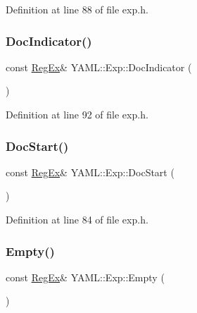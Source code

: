 Definition at line 88 of file exp.\+h.

\mbox{\label{namespace_y_a_m_l_1_1_exp_a1e28f9da39a4eece5e251bbdfce48674}} 
\subsubsection{\texorpdfstring{DocIndicator()}{DocIndicator()}}
{\footnotesize\ttfamily const \mbox{\hyperlink{class_y_a_m_l_1_1_reg_ex}{Reg\+Ex}}\& Y\+A\+M\+L\+::\+Exp\+::\+Doc\+Indicator (\begin{DoxyParamCaption}{ }\end{DoxyParamCaption})\hspace{0.3cm}{\ttfamily [inline]}}



Definition at line 92 of file exp.\+h.

\mbox{\label{namespace_y_a_m_l_1_1_exp_a1c6c45e1b69708b90a543ed63f65c375}} 
\subsubsection{\texorpdfstring{DocStart()}{DocStart()}}
{\footnotesize\ttfamily const \mbox{\hyperlink{class_y_a_m_l_1_1_reg_ex}{Reg\+Ex}}\& Y\+A\+M\+L\+::\+Exp\+::\+Doc\+Start (\begin{DoxyParamCaption}{ }\end{DoxyParamCaption})\hspace{0.3cm}{\ttfamily [inline]}}



Definition at line 84 of file exp.\+h.

\mbox{\label{namespace_y_a_m_l_1_1_exp_ad8890f8583c74e2547858e2f57c62464}} 
\subsubsection{\texorpdfstring{Empty()}{Empty()}}
{\footnotesize\ttfamily const \mbox{\hyperlink{class_y_a_m_l_1_1_reg_ex}{Reg\+Ex}}\& Y\+A\+M\+L\+::\+Exp\+::\+Empty (\begin{DoxyParamCaption}{ }\end{DoxyParamCaption})\hspace{0.3cm}{\ttfamily [inline]}}



